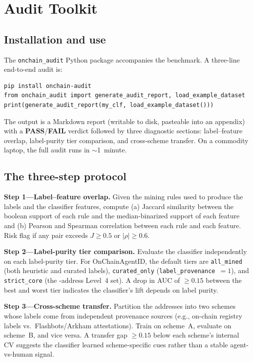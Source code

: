 \documentclass[10pt]{article}
\begin{document}
\section{Audit Toolkit}
\label{sec:audit}

\subsection{Installation and use}

The \texttt{onchain\_audit} Python package accompanies the benchmark. A three-line end-to-end audit is:

\begin{verbatim}
pip install onchain-audit
from onchain_audit import generate_audit_report, load_example_dataset
print(generate_audit_report(my_clf, load_example_dataset()))
\end{verbatim}

The output is a Markdown report (writable to disk, pasteable into an appendix) with a \textbf{PASS}/\textbf{FAIL} verdict followed by three diagnostic sections: label--feature overlap, label-purity tier comparison, and cross-scheme transfer. On a commodity laptop, the full audit runs in $\sim$1~minute.

\subsection{The three-step protocol}

\textbf{Step 1---Label--feature overlap.} Given the mining rules used to produce the labels and the classifier features, compute (a) Jaccard similarity between the boolean support of each rule and the median-binarized support of each feature and (b) Pearson and Spearman correlation between each rule and each feature. Risk flag if any pair exceeds $J \geq 0.5$ or $|\rho| \geq 0.6$.

\textbf{Step 2---Label-purity tier comparison.} Evaluate the classifier independently on each label-purity tier. For OnChainAgentID, the default tiers are \texttt{all\_mined} (both heuristic and curated labels), \texttt{curated\_only} (\texttt{label\_provenance}~$=1$), and \texttt{strict\_core} (the \datasetStrictCoreN{}-address Level~4 set). A drop in AUC of $\geq 0.15$ between the best and worst tier indicates the classifier's lift depends on label purity.

\textbf{Step 3---Cross-scheme transfer.} Partition the addresses into two schemes whose labels come from independent provenance sources (e.g., on-chain registry labels vs.\ Flashbots/Arkham attestations). Train on scheme~A, evaluate on scheme~B, and vice versa. A transfer gap $\geq 0.15$ below each scheme's internal CV suggests the classifier learned scheme-specific cues rather than a stable agent-vs-human signal.
\end{document}
